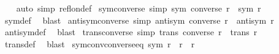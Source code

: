 \begin{isabellebody}
%
\isadelimproof
\ \ %
\endisadelimproof
%
\isatagproof
{}\isamarkupfalse%
\ {\isacharparenleft}{\kern0pt}auto\ simp{\isacharcolon}{\kern0pt}\ refl{\isacharunderscore}{\kern0pt}on{\isacharunderscore}{\kern0pt}def{\isacharparenright}{\kern0pt}%
\endisatagproof
{\isafoldproof}%
%
\isadelimproof
\isanewline
%
\endisadelimproof
\isanewline
{}\isamarkupfalse%
\ sym{\isacharunderscore}{\kern0pt}converse\ {\isacharbrackleft}{\kern0pt}simp{\isacharbrackright}{\kern0pt}{\isacharcolon}{\kern0pt}\ {\isachardoublequoteopen}sym\ {\isacharparenleft}{\kern0pt}converse\ r{\isacharparenright}{\kern0pt}\ {\isacharequal}{\kern0pt}\ sym\ r{\isachardoublequoteclose}\isanewline
%
\isadelimproof
\ \ %
\endisadelimproof
%
\isatagproof
{}\isamarkupfalse%
\ sym{\isacharunderscore}{\kern0pt}def\ \isamarkupfalse%
\ blast%
\endisatagproof
{\isafoldproof}%
%
\isadelimproof
\isanewline
%
\endisadelimproof
\isanewline
{}\isamarkupfalse%
\ antisym{\isacharunderscore}{\kern0pt}converse\ {\isacharbrackleft}{\kern0pt}simp{\isacharbrackright}{\kern0pt}{\isacharcolon}{\kern0pt}\ {\isachardoublequoteopen}antisym\ {\isacharparenleft}{\kern0pt}converse\ r{\isacharparenright}{\kern0pt}\ {\isacharequal}{\kern0pt}\ antisym\ r{\isachardoublequoteclose}\isanewline
%
\isadelimproof
\ \ %
\endisadelimproof
%
\isatagproof
{}\isamarkupfalse%
\ antisym{\isacharunderscore}{\kern0pt}def\ \isamarkupfalse%
\ blast%
\endisatagproof
{\isafoldproof}%
%
\isadelimproof
\isanewline
%
\endisadelimproof
\isanewline
{}\isamarkupfalse%
\ trans{\isacharunderscore}{\kern0pt}converse\ {\isacharbrackleft}{\kern0pt}simp{\isacharbrackright}{\kern0pt}{\isacharcolon}{\kern0pt}\ {\isachardoublequoteopen}trans\ {\isacharparenleft}{\kern0pt}converse\ r{\isacharparenright}{\kern0pt}\ {\isacharequal}{\kern0pt}\ trans\ r{\isachardoublequoteclose}\isanewline
%
\isadelimproof
\ \ %
\endisadelimproof
%
\isatagproof
{}\isamarkupfalse%
\ trans{\isacharunderscore}{\kern0pt}def\ \isamarkupfalse%
\ blast%
\endisatagproof
{\isafoldproof}%
%
\isadelimproof
\isanewline
%
\endisadelimproof
\isanewline
{}\isamarkupfalse%
\ sym{\isacharunderscore}{\kern0pt}conv{\isacharunderscore}{\kern0pt}converse{\isacharunderscore}{\kern0pt}eq{\isacharcolon}{\kern0pt}\ {\isachardoublequoteopen}sym\ r\ {\isasymlongleftrightarrow}\ r{\isasyminverse}\ {\isacharequal}{\kern0pt}\ r{\isachardoublequoteclose}\isanewline
%
\isadelimproof
\ \ %
\endisadelimproof
%
\isatagproof
{}\isamarkupfalse%

\end{isabellebody}
